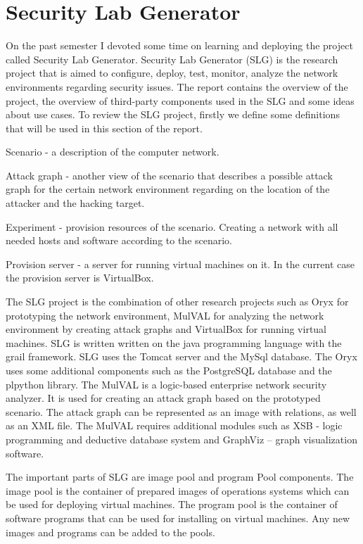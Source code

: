 %


\section{Security Lab Generator}
On the past semester I devoted some time on learning and deploying the project called Security Lab Generator.
Security Lab Generator (SLG) is the research project that is aimed to configure, deploy, test, monitor, analyze the network environments regarding security issues. The report contains the overview of the project, the overview of third-party components used in the SLG and some ideas about use cases.
To review the SLG project, firstly we define some definitions that will be used in this section of the report. 

\begin{compactitem}
\item Scenario - a description of the computer network. 
\item Attack graph - another view of the scenario that describes a possible attack graph for the certain network environment regarding on the location of the attacker and the hacking target.   
\item Experiment - provision resources of the scenario. Creating a network with all needed hosts and software according to the scenario.
\item Provision server - a server for running virtual machines on it. In the current case the provision server  is VirtualBox.
\end{compactitem}

The SLG project is the combination of other research projects such as Oryx for prototyping the network environment, MulVAL for analyzing the network environment by creating attack graphs and VirtualBox for running virtual machines. SLG is written written on the java programming language with the grail framework. SLG uses the Tomcat server and the MySql database. The Oryx uses some additional components such as the PostgreSQL database and the plpython library. The MulVAL is a logic-based enterprise network security analyzer. It is used for creating an attack graph based on the prototyped scenario. The attack graph can be represented as an image with relations, as well as an XML file. The MulVAL requires additional modules such as XSB - logic programming and deductive database system and GraphViz – graph visualization software. 

The important parts of SLG are image pool and program Pool components. The image pool is the container of prepared images of operations systems which can be used for deploying virtual machines. The program pool is the container of software programs that can be used for installing on virtual machines. Any new images and programs can be added to the pools.

